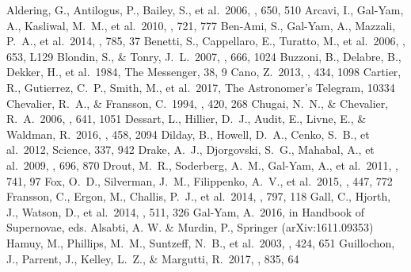 \documentclass[twocolumn]{aastex61}
\begin{document}
\begin{thebibliography}{}
 Aldering, G., Antilogus, P., Bailey, S., et al.\ 2006, \apj, 650, 510 
 Arcavi, I., Gal-Yam, A., Kasliwal, M.~M., et al.\ 2010, \apj, 721, 777 
 Ben-Ami, S., Gal-Yam, A., Mazzali, P.~A., et al.\ 2014, \apj, 785, 37 
 Benetti, S., Cappellaro, E., Turatto, M., et al.\ 2006, \apjl, 653, L129 
 Blondin, S., \& Tonry, J.~L.\ 2007, \apj, 666, 1024 
 Buzzoni, B., Delabre, B., Dekker, H., et al.\ 1984, The Messenger, 38, 9 
 Cano, Z.\ 2013, \mnras, 434, 1098 
 Cartier, R., Gutierrez, C.~P., Smith, M., et al.\ 2017, The Astronomer's Telegram, 10334
 Chevalier, R.~A., \& Fransson, C.\ 1994, \apj, 420, 268 
 Chugai, N.~N., \& Chevalier, R.~A.\ 2006, \apj, 641, 1051 
 Dessart, L., Hillier, D.~J., Audit, E., Livne, E., \& Waldman, R.\ 2016, \mnras, 458, 2094 
 Dilday, B., Howell, D.~A., Cenko, S.~B., et al.\ 2012, Science, 337, 942 
 Drake, A.~J., Djorgovski, S.~G., Mahabal, A., et al.\ 2009, \apj, 696, 870 
 Drout, M.~R., Soderberg, A.~M., Gal-Yam, A., et al.\ 2011, \apj, 741, 97   
 Fox, O.~D., Silverman, J.~M., Filippenko, A.~V., et al.\ 2015, \mnras, 447, 772 
 Fransson, C., Ergon, M., Challis, P.~J., et al.\ 2014, \apj, 797, 118 
 Gall, C., Hjorth, J., Watson, D., et al.\ 2014, \nat, 511, 326 
 Gal-Yam, A.\ 2016, in Handbook of Supernovae, eds. Alsabti, A. W. \& Murdin, P., Springer (arXiv:1611.09353)
 Hamuy, M., Phillips, M.~M., Suntzeff, N.~B., et al.\ 2003, \nat, 424, 651 
 Guillochon, J., Parrent, J., Kelley, L.~Z., \& Margutti, R.\ 2017, \apj, 835, 64 

\end{thebibliography}
\end{document}

